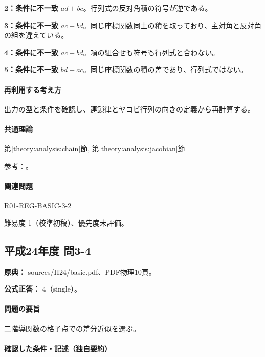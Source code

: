 \noindent\textbf{2：条件に不一致} \(ad+bc\)。行列式の反対角積の符号が逆である。\par

\noindent\textbf{3：条件に不一致} \(ac-bd\)。同じ座標関数同士の積を取っており、主対角と反対角の組を違えている。\par

\noindent\textbf{4：条件に不一致} \(ac+bd\)。項の組合せも符号も行列式と合わない。\par

\noindent\textbf{5：条件に不一致} \(bd-ac\)。同じ座標関数の積の差であり、行列式ではない。\par

\paragraph{再利用する考え方} 出力の型と条件を確認し、連鎖律とヤコビ行列の向きの定義から再計算する。

\paragraph{共通理論} \hyperref[theory:analysis:chain]{第\ref*{theory:analysis:chain}節}, \hyperref[theory:analysis:jacobian]{第\ref*{theory:analysis:jacobian}節}

\par 参考：\cite{mit_chain2007}。

\paragraph{関連問題} \hyperref[q:r01-reg-basic-3-2]{R01-REG-BASIC-3-2}

\par 難易度 1（校準初稿）、優先度未評価。

\subsection{平成24年度 問3-4}
\label{q:h24-reg-basic-3-4}

\noindent\textbf{原典：} sources/H24/basic.pdf、PDF物理10頁。

\textbf{公式正答：} 4（single）。

\paragraph{問題の要旨} 二階導関数の格子点での差分近似を選ぶ。

\paragraph{確認した条件・記述（独自要約）}\mbox{}\par

